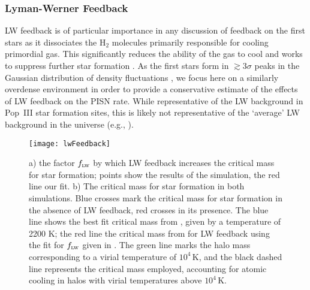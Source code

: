 \documentclass[../thesis.tex]{subfiles}
\begin{document}
\subsubsection{Lyman-Werner Feedback}
\label{lymanWerner}
LW feedback is of particular importance in any discussion of feedback
on the first stars as it dissociates the H$_2$ molecules primarily
responsible for cooling primordial gas.  This significantly reduces
the ability of the gas to cool and works to suppress further star
formation \citep{HaimanReesLoeb1997, OmukaiNishi1999,
  CiardiFerraraAbel2000, HaimanAbelRees2000, GloverBrand2001,
  Kitayamaetal2001, MachacekBryanAbel2001, RicottiGnedinShull2001,
  RicottiGnedinShull2002a, RicottiGnedinShull2002b, Yoshidaetal2003,
  OmukaiYoshii2003, MesingerBryanHaiman2006}.  As the first stars form
in $\gtrsim 3\sigma$ peaks in the Gaussian distribution of density
fluctuations \citep{BarkanaLoeb2001}, we focus here on a similarly
overdense environment in order to provide a conservative estimate of
the effects of LW feedback on the PISN rate.  While representative of
the LW background in Pop~III star formation sites, this is likely not
representative of the `average' LW background in the universe (e.g.,
\citealt{MachacekBryanAbel2001, MesingerBryanHaiman2006}).

\begin{figure}
 \begin{center}
   \texttt{[image: lwFeedback]}
   \caption{a) the factor $f_{\textsc{lw}}$ by which
     LW feedback increases the critical mass for star formation;
     points show the results of the simulation, the red line our fit.
     b) The critical mass for star formation in both simulations.
     Blue crosses mark the critical mass for star formation in the
     absence of LW feedback, red crosses in its presence.  The blue
     line shows the best fit critical mass from , given
     by a temperature of 2200 K; the red line the critical mass from
      for LW feedback using the fit for
     $f_{\textsc{lw}}$ given in .  The green line marks
     the halo mass corresponding to a virial temperature of $10^4\,$K,
     and the black dashed line represents the critical mass employed,
     accounting for atomic cooling in halos with virial temperatures
     above $10^4\,$K.}
   \label{lwFeedback}
 \end{center}
\end{figure}
\end{document}
